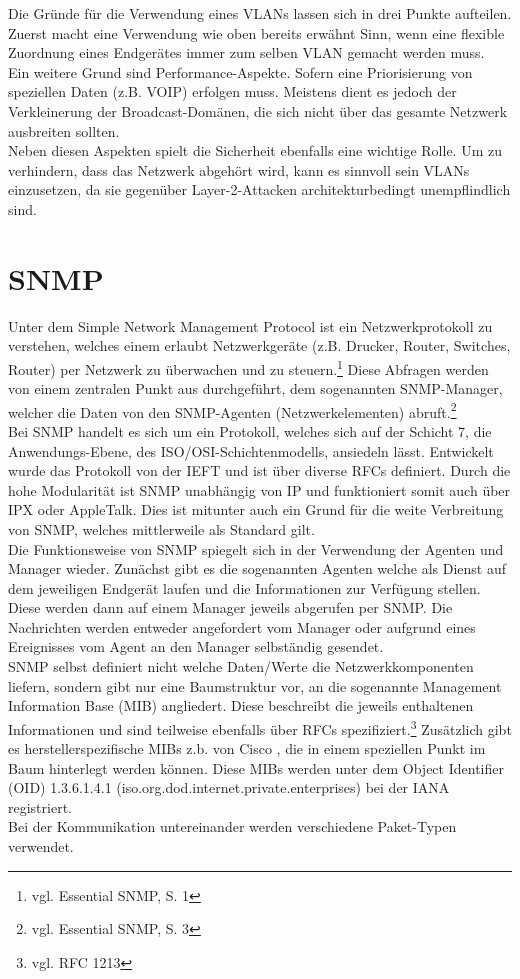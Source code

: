 Die Gründe für die Verwendung eines VLANs lassen sich in drei Punkte aufteilen.
Zuerst macht eine Verwendung wie oben bereits erwähnt Sinn, wenn eine flexible Zuordnung eines Endgerätes immer zum selben VLAN gemacht werden muss.\\
Ein weitere Grund sind Performance-Aspekte. Sofern eine Priorisierung von speziellen Daten (z.B. VOIP) erfolgen muss. Meistens dient es jedoch der Verkleinerung der Broadcast-Domänen, die sich nicht über das gesamte Netzwerk ausbreiten sollten.\\
Neben diesen Aspekten spielt die Sicherheit ebenfalls eine wichtige Rolle. Um zu verhindern, dass das Netzwerk abgehört wird, kann es sinnvoll sein VLANs einzusetzen, da sie gegenüber Layer-2-Attacken architekturbedingt unempflindlich sind.


\section{SNMP}
\label{sec:snmp}
Unter dem Simple Network Management Protocol ist ein Netzwerkprotokoll zu verstehen, welches einem erlaubt Netzwerkgeräte (z.B. Drucker, Router, Switches, Router) per Netzwerk zu überwachen und zu steuern.\footnote{vgl. Essential SNMP, S. 1}
Diese Abfragen werden von einem zentralen Punkt aus durchgeführt, dem sogenannten SNMP-Manager, welcher die Daten von den SNMP-Agenten (Netzwerkelementen) abruft.\footnote{vgl. Essential SNMP, S. 3}\\
Bei SNMP handelt es sich um ein Protokoll, welches sich auf der Schicht 7, die Anwendungs-Ebene, des ISO/OSI-Schichtenmodells, ansiedeln lässt.
Entwickelt wurde das Protokoll von der IEFT und ist über diverse RFCs definiert.
Durch die hohe Modularität ist SNMP unabhängig von IP und funktioniert somit auch über IPX oder AppleTalk. Dies ist mitunter auch ein Grund für die weite Verbreitung von SNMP, welches mittlerweile als Standard gilt.\\
Die Funktionsweise von  SNMP spiegelt sich in der Verwendung der Agenten und Manager wieder.
Zunächst gibt es die sogenannten Agenten welche als Dienst auf dem jeweiligen Endgerät laufen und die Informationen zur Verfügung stellen. Diese werden dann auf einem Manager jeweils abgerufen per SNMP. Die Nachrichten werden entweder angefordert vom Manager oder aufgrund eines Ereignisses vom Agent an den Manager selbständig gesendet.\\
SNMP selbst definiert nicht welche Daten/Werte die Netzwerkkomponenten liefern, sondern gibt nur eine Baumstruktur vor, an die sogenannte Management Information Base (MIB) angliedert.
Diese beschreibt die jeweils enthaltenen Informationen und sind teilweise ebenfalls über RFCs spezifiziert.\footnote{vgl. RFC 1213} Zusätzlich gibt es herstellerspezifische MIBs z.b. von Cisco , die in einem speziellen Punkt im Baum hinterlegt werden können. Diese MIBs werden unter dem  Object Identifier (OID) 1.3.6.1.4.1 (iso.org.dod.internet.private.enterprises) bei der IANA registriert.\\
Bei der Kommunikation untereinander werden verschiedene Paket-Typen verwendet.

